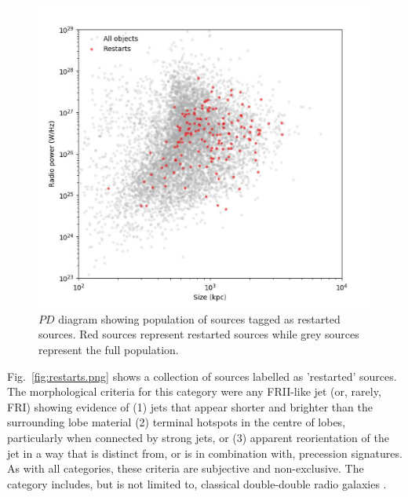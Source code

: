 \documentclass{aa}
\begin{document}
\begin{figure}
\includegraphics[width=1\linewidth]{Images/results/scatter_restarts.png}
\caption{$PD$ diagram showing population of sources tagged as restarted sources. Red sources represent restarted sources while grey sources represent the full population.}
\label{fig:scatter_restarts.png}
\end{figure}

Fig.~\ref{fig:restarts.png} shows a collection of sources labelled as 'restarted' sources. The morphological criteria for this category were any FRII-like jet (or, rarely, FRI) showing evidence of (1) jets that appear shorter and brighter than the surrounding lobe material (2) terminal hotspots in the centre of lobes, particularly when connected by strong jets, or (3) apparent reorientation of the jet in a way that is distinct from, or is in combination with, precession signatures. As with all categories, these criteria are subjective and non-exclusive. The category includes, but is not limited to, classical double-double radio galaxies \citep[e.g.,][]{schoenmakers00b,mahatma19}.
\end{document}
